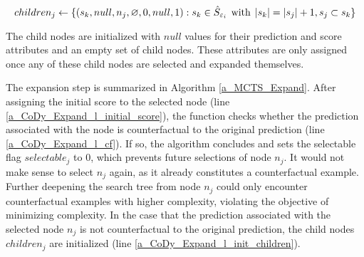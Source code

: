 



\begin{equation}
    children_j \gets \{(s_k, null, n_j, \varnothing, 0, null, 1): s_k \in \hat{S}_{\varepsilon_i} \hspace{1.5mm} \mathrm{with} \hspace{1.5mm} |s_k| = |s_j| + 1, s_j \subset s_k\}
\end{equation}

The child nodes are initialized with $null$ values for their prediction and score attributes and an empty set of child nodes. These attributes are only assigned once any of these child nodes are selected and expanded themselves.

The expansion step is summarized in Algorithm \ref{a_MCTS_Expand}. After assigning the initial score to the selected node (line \ref{a_CoDy_Expand_l_initial_score}), the function checks whether the prediction associated with the node is counterfactual to the original prediction (line \ref{a_CoDy_Expand_l_cf}). If so, the algorithm concludes and sets the selectable flag $selectable_j$ to $0$, which prevents future selections of node $n_j$. It would not make sense to select $n_j$ again, as it already constitutes a counterfactual example. Further deepening the search tree from node $n_j$ could only encounter counterfactual examples with higher complexity, violating the objective of minimizing complexity. In the case that the prediction associated with the selected node $n_j$ is not counterfactual to the original prediction, the child nodes $children_j$ are initialized (line \ref{a_CoDy_Expand_l_init_children}).

